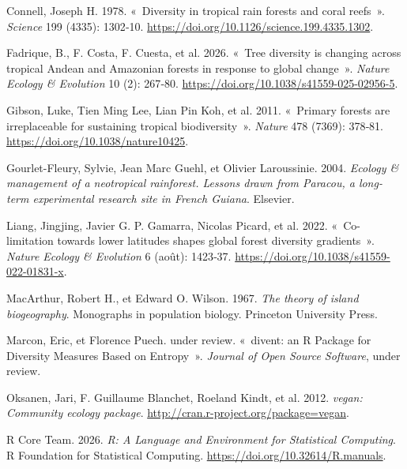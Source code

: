 \documentclass[
  french,
  11pt,
]{stylisharticle}
\newlength{\cslhangindent}
\newenvironment{CSLReferences}[2] %
 {\begin{list}{}{%
  \setlength{\itemindent}{0pt}
  \setlength{\leftmargin}{0pt}
  \setlength{\parsep}{0pt}
  \ifodd #1
   \setlength{\leftmargin}{\cslhangindent}
   \setlength{\itemindent}{-1\cslhangindent}
  \fi
  \setlength{\itemsep}{#2\baselineskip}}}
 {\end{list}}
\begin{document}
\protect{}\label{refs}
\begin{CSLReferences}{1}{1}
Connell, Joseph H. 1978. {«~Diversity in tropical rain forests and coral
reefs~»}. \emph{Science} 199 (4335): 1302‑10.
\url{https://doi.org/10.1126/science.199.4335.1302}.

{Fadrique, B., F. Costa, F. Cuesta, et al.} 2026. {«~Tree diversity is
changing across tropical Andean and Amazonian forests in response to
global change~»}. \emph{Nature Ecology \& Evolution} 10 (2): 267‑80.
\url{https://doi.org/10.1038/s41559-025-02956-5}.

{Gibson, Luke, Tien Ming Lee, Lian Pin Koh, et al.} 2011. {«~Primary
forests are irreplaceable for sustaining tropical biodiversity~»}.
\emph{Nature} 478 (7369): 378‑81.
\url{https://doi.org/10.1038/nature10425}.

Gourlet-Fleury, Sylvie, Jean Marc Guehl, et Olivier Laroussinie. 2004.
\emph{Ecology \& management of a neotropical rainforest. Lessons drawn
from Paracou, a long-term experimental research site in French Guiana}.
Elsevier.

{Liang, Jingjing, Javier G. P. Gamarra, Nicolas Picard, et al.} 2022.
{«~Co-limitation towards lower latitudes shapes global forest diversity
gradients~»}. \emph{Nature Ecology \& Evolution} 6 (août): 1423‑37.
\url{https://doi.org/10.1038/s41559-022-01831-x}.

MacArthur, Robert H., et Edward O. Wilson. 1967. \emph{The theory of
island biogeography}. Monographs in population biology. Princeton
University Press.

Marcon, Eric, et Florence Puech. under review. {«~divent: an {R} Package
for Diversity Measures Based on Entropy~»}. \emph{Journal of Open Source
Software}, under review.

Oksanen, Jari, F. Guillaume Blanchet, Roeland Kindt, et al. 2012.
\emph{vegan: Community ecology package}.
\url{http://cran.r-project.org/package=vegan}.

R Core Team. 2026. \emph{R: A Language and Environment for Statistical
Computing}. R Foundation for Statistical Computing.
\url{https://doi.org/10.32614/R.manuals}.


\end{CSLReferences}
\end{document}
